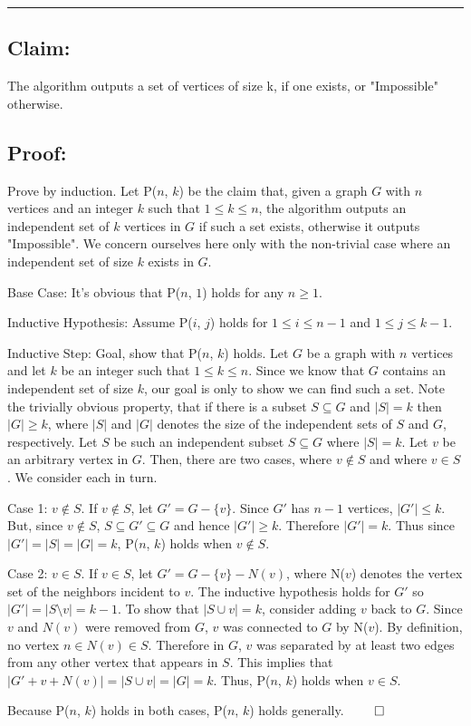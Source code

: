 \documentclass[11pt]{article}
\def\sm{\setminus}
\begin{document}
\noindent\textcolor[RGB]{220,220,220}{\rule{\linewidth}{0.8pt}}

\subsection*{Claim:}

The algorithm outputs a set of vertices of size k, if one exists, or "Impossible" otherwise. 

\subsection*{Proof:}

Prove by induction. Let P($n$, $k$) be the claim that, given a graph $G$ with $n$ vertices and an integer $k$ such that $1 \leq k \leq n$, the algorithm outputs an independent set of $k$ vertices in $G$ if such a set exists, otherwise it outputs "Impossible". We concern ourselves here only with the non-trivial case where an independent set of size $k$ exists in $G$.  

Base Case: It's obvious that P($n$, $1$) holds for any $n \geq 1$.

Inductive Hypothesis: Assume P($i$, $j$) holds for $1 \leq i \leq n-1$ and $1 \leq j \leq k-1$. 

Inductive Step: Goal, show that P($n$, $k$) holds. Let $G$ be a graph with $n$ vertices and let $k$ be an integer such that $1 \leq k \leq n$. Since we know that $G$ contains an independent set of size $k$, our goal is only to show we can find such a set. Note the trivially obvious property, that if there is a subset $S \subseteq G$ and $|S| = k$ then $|G| \geq k$, where $|S|$ and $|G|$ denotes the size of the independent sets of $S$ and $G$, respectively. Let $S$ be such an independent subset $S \subseteq G$ where $|S| = k$. Let $v$ be an arbitrary vertex in $G$. Then, there are two cases, where $v \not\in S$ and where $v \in S$. We consider each in turn.  

Case 1: $v \not\in S$.
If $v \not\in S$, let $G' = G - \{v\}$. Since $G'$ has $n - 1$ vertices, $|G'| \leq k$. But, since $v \not\in S$, $S \subseteq G' \subseteq G$ and hence $|G'| \geq k$. Therefore $|G'| = k$. Thus since $|G'| = |S| = |G| = k$, P($n$, $k$) holds when $v \not\in S$.

Case 2: $v \in S$.
If $v \in S$, let $G' = G - \{v\} - N(v)$, where N($v$) denotes the vertex set of the neighbors incident to $v$. The inductive hypothesis holds for $G'$ so $|G'| = |S \sm v| = k - 1$. To show that $|S \cup v| = k$, consider adding $v$ back to $G$. Since $v$ and $N(v)$ were removed from $G$, $v$ was connected to $G$ by N($v$). By definition, no vertex $n \in N(v) \in S$. Therefore in $G$, $v$ was separated by at least two edges from any other vertex that appears in $S$. This implies that $|G' + v + N(v)| = |S \cup v| = |G| = k$. Thus, P($n$, $k$) holds when $v \in S$.

Because P($n$, $k$) holds in both cases, P($n$, $k$) holds generally. $\qed$
\end{document}

